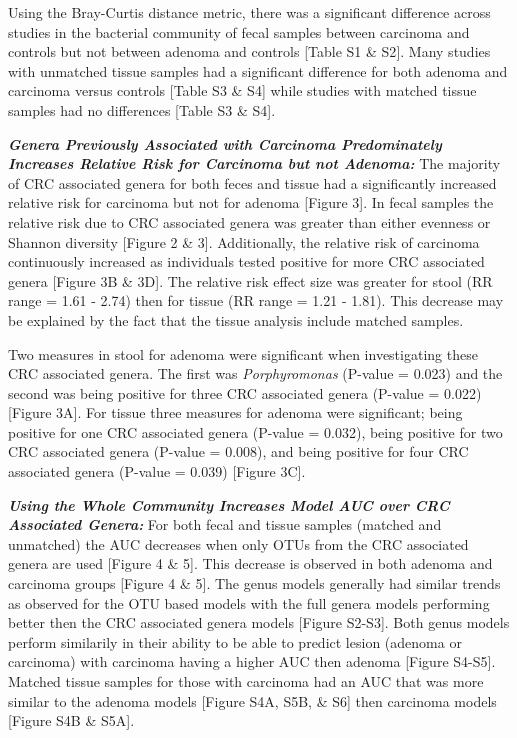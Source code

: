 \documentclass[12pt,]{article}
\begin{document}
Using the Bray-Curtis distance metric, there was a significant
difference across studies in the bacterial community of fecal samples
between carcinoma and controls but not between adenoma and controls
{[}Table S1 \& S2{]}. Many studies with unmatched tissue samples had a
significant difference for both adenoma and carcinoma versus controls
{[}Table S3 \& S4{]} while studies with matched tissue samples had no
differences {[}Table S3 \& S4{]}.

\textbf{\emph{Genera Previously Associated with Carcinoma Predominately
Increases Relative Risk for Carcinoma but not Adenoma:}} The majority of
CRC associated genera for both feces and tissue had a significantly
increased relative risk for carcinoma but not for adenoma {[}Figure
3{]}. In fecal samples the relative risk due to CRC associated genera
was greater than either evenness or Shannon diversity {[}Figure 2 \&
3{]}. Additionally, the relative risk of carcinoma continuously
increased as individuals tested positive for more CRC associated genera
{[}Figure 3B \& 3D{]}. The relative risk effect size was greater for
stool (RR range = 1.61 - 2.74) then for tissue (RR range = 1.21 - 1.81).
This decrease may be explained by the fact that the tissue analysis
include matched samples.

Two measures in stool for adenoma were significant when investigating
these CRC associated genera. The first was \emph{Porphyromonas} (P-value
= 0.023) and the second was being positive for three CRC associated
genera (P-value = 0.022) {[}Figure 3A{]}. For tissue three measures for
adenoma were significant; being positive for one CRC associated genera
(P-value = 0.032), being positive for two CRC associated genera (P-value
= 0.008), and being positive for four CRC associated genera (P-value =
0.039) {[}Figure 3C{]}.

\textbf{\emph{Using the Whole Community Increases Model AUC over CRC
Associated Genera:}} For both fecal and tissue samples (matched and
unmatched) the AUC decreases when only OTUs from the CRC associated
genera are used {[}Figure 4 \& 5{]}. This decrease is observed in both
adenoma and carcinoma groups {[}Figure 4 \& 5{]}. The genus models
generally had similar trends as observed for the OTU based models with
the full genera models performing better then the CRC associated genera
models {[}Figure S2-S3{]}. Both genus models perform similarily in their
ability to be able to predict lesion (adenoma or carcinoma) with
carcinoma having a higher AUC then adenoma {[}Figure S4-S5{]}. Matched
tissue samples for those with carcinoma had an AUC that was more similar
to the adenoma models {[}Figure S4A, S5B, \& S6{]} then carcinoma models
{[}Figure S4B \& S5A{]}.
\end{document}
